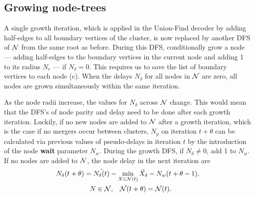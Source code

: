 \subsection{Growing node-trees}\label{sec:grownodetrees}

A single growth iteration, which is applied in the Union-Find decoder by adding half-edges to all boundary vertices of the cluster, is now replaced by another DFS of $\mathcal{N}$ from the same root as before. During this DFS, conditionally grow a node --- adding half-edges to the boundary vertices in the current node and adding 1 to its radius $N_r$ --- if $N_\delta = 0$. This requires us to save the list of boundary vertices to each node (c). When the delays $N_\delta$ for all nodes in $\mathcal{N}$ are zero, all nodes are grown simultaneously within the same iteration. 

As the node radii increase, the values for $N_\delta$ across $\mathcal{N}$ change. This would mean that the DFS's of node parity and delay need to be done after each growth iteration. Luckily, if no new nodes are added to $\mathcal{N}$ after a growth iteration, which is the case if no mergers occur between clusters, $N_p$ on iteration $t+\theta$ can be calculated via previous values of pseudo-delays in iteration $t$ by the introduction of the node \textbf{wait} parameter $N_w$. During the growth DFS, if $N_\delta \neq 0$, add 1 to $N_w$. If no nodes are added to $\mathcal{N}$, the node delay in the next iteration are
\begin{multline}\label{eq:suspension}
    N_\delta(t+\theta) = \tilde{N_\delta(t)} - \min_{X \in \mathcal{N}(t)}{\tilde{X_\delta}} - N_w(t+\theta-1),  \\
    \hspace{.3cm} N \in \mathcal{N}, \hspace{.3cm} \mathcal{N}(t+\theta) = \mathcal{N}(t).  
\end{multline}



